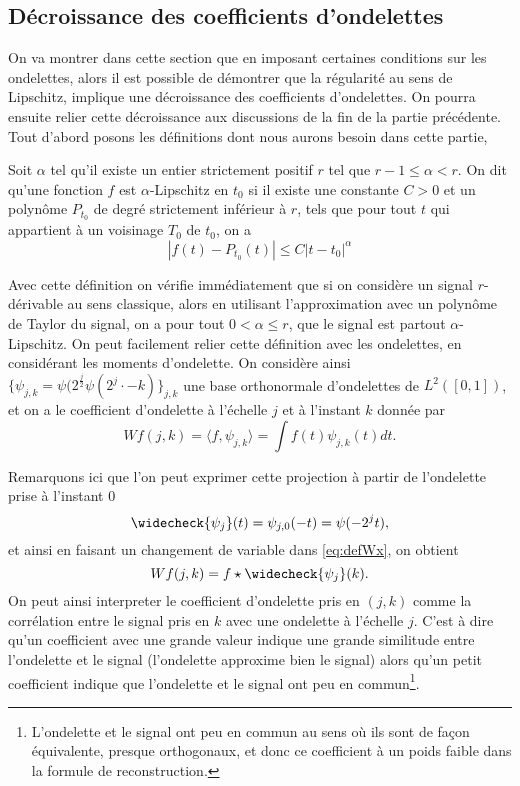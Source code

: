 \subsection{Décroissance des coefficients d'ondelettes}
On va montrer dans cette section que en imposant certaines conditions sur les ondelettes, alors il est possible de démontrer que la régularité au sens de Lipschitz, implique une décroissance des coefficients d'ondelettes.
On pourra ensuite relier cette décroissance aux discussions de la fin de la partie précédente.
\newline
Tout d'abord posons les définitions dont nous aurons besoin dans cette partie,
\begin{definition}
	Soit $\alpha$ tel qu'il existe un entier strictement positif $r$ tel que $r-1 \leq \alpha <r$. On dit qu'une fonction $f$ est $\alpha$-Lipschitz en $t_0$ si il existe une constante $C>0$ et un polynôme $P_{t_0}$ de degré strictement inférieur à $r$, tels que pour tout $t$ qui appartient à un voisinage $T_0$ de $t_0$, on a 
	\begin{equation*}
		|f(t) - P_{t_0}(t)| \leq C|t-t_0|^{\alpha}
	\end{equation*}
\end{definition}
Avec cette définition on vérifie immédiatement que si on considère un signal $r$-dérivable au sens classique, alors en utilisant l'approximation avec un polynôme de Taylor du signal, on a pour tout $0 < \alpha \leq r$, que le signal est partout $\alpha$-Lipschitz.
\newline
On peut facilement relier cette définition avec les ondelettes, en considérant les moments d'ondelette.
On considère ainsi $\{\psi_{j, k} = \psi( 2^{\frac{j}{2}}\psi(2^j\cdot -k)\}_{j,k}$ une base orthonormale d'ondelettes de $L^2([0, 1])$, et on a le coefficient d'ondelette à l'échelle $j$ et à l'instant $k$ donnée par
\begin{equation*}\label{eq:defWx}
	Wf (j, k) = \langle f, \psi_{j,k} \rangle = \int f(t) \psi_{j,k}(t)dt.
\end{equation*}
\begin{remarque}
Remarquons ici que l'on peut exprimer cette projection à partir de l'ondelette prise à l'instant $0$
\begin{equation*}
	\widecheck{\psi_j}(t) = \psi_{j, 0}(-t) = \psi(-2^jt),
\end{equation*}
et ainsi en faisant un changement de variable dans \ref{eq:defWx}, on obtient
\begin{equation}
	Wf(j,k) = f \star \widecheck{\psi_j}(k).
\end{equation}
On peut ainsi interpreter le coefficient d'ondelette pris en $(j,k)$ comme la corrélation entre le signal pris en $k$ avec une ondelette à l'échelle $j$.
C'est à dire qu'un coefficient avec une grande valeur indique une grande similitude entre l'ondelette et le signal (l'ondelette approxime bien le signal) alors qu'un petit coefficient indique que l'ondelette et le signal ont peu en commun\footnote{L'ondelette et le signal ont peu en commun au sens où ils sont de façon équivalente, presque orthogonaux, et donc ce coefficient à un poids faible dans la formule de reconstruction.}.
\end{remarque}
